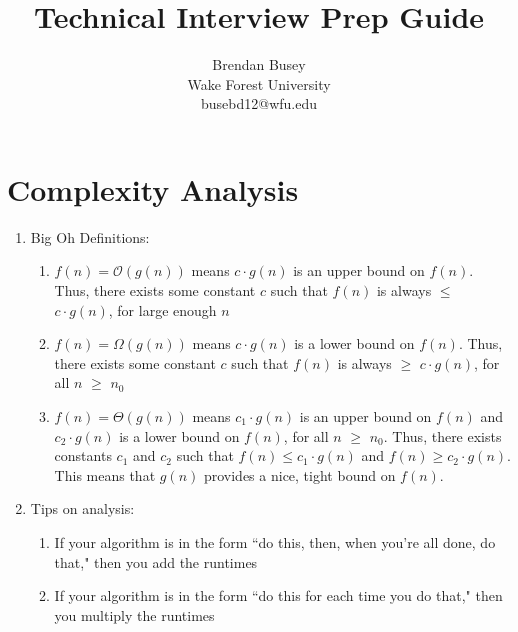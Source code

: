 \documentclass [12pt, executivepaper]{article}
\begin{document}
\title {Technical Interview Prep Guide}
\author{Brendan Busey\\Wake Forest University\\ busebd12@wfu.edu}
\maketitle

\pagebreak

\vspace*{-40mm}

\section*{Complexity Analysis}

\begin{enumerate}

\item Big Oh Definitions:

\begin{enumerate}

\item $f(n)=\mathcal{O}(g(n))$ means $c \cdot g(n)$ is an upper bound on $f(n)$. Thus, there exists some constant $c$ such that $f(n)$ is always $\leq$ $c \cdot g(n)$, for large enough $n$

\item $f(n)=\Omega(g(n))$ means $c \cdot g(n)$ is a lower bound on $f(n)$. Thus, there exists some constant $c$ such that $f(n)$ is always $\geq$ $c \cdot g(n)$, for all $n$ $\geq$ $n_{0}$

\item $f(n)=\Theta(g(n))$ means $c_{1} \cdot g(n)$ is an upper bound on $f(n)$ and $c_{2} \cdot g(n)$ is a lower bound on $f(n)$, for all $n$ $\geq$ $n_{0}$. Thus, there exists constants $c_{1}$ and $c_{2}$ such that
$f(n) \leq c_{1} \cdot g(n)$ and $f(n) \geq c_{2} \cdot g(n)$. This means that $g(n)$ provides a nice, tight bound on $f(n)$.

\end{enumerate}

\item Tips on analysis:

\begin{enumerate}

\item If your algorithm is in the form ``do this, then, when you're all done, do that," then you add the runtimes

\item If your algorithm is in the form ``do this for each time you do that," then you multiply the runtimes


\end{enumerate}
\end{enumerate}
\end{document}
